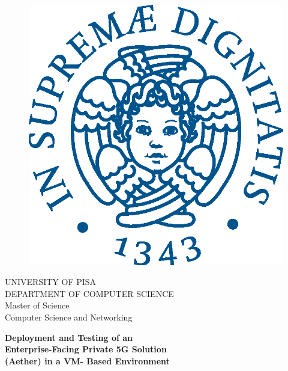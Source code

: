 \begin{titlepage}
\begin{figure}[!htb]
    \centering
    \includegraphics[keepaspectratio=true,scale=0.5]{images/logo/logo.eps}
\end{figure}

\begin{center}
    \LARGE{UNIVERSITY OF PISA}
    \vspace{5mm}
    \\ \large{DEPARTMENT OF COMPUTER SCIENCE}
    \vspace{5mm}
    \\ \LARGE{Master of Science \\ \vspace{2mm} Computer Science and Networking
}
\end{center}

\vspace{10mm}
\begin{center}
    {\LARGE{\bf Deployment and Testing of an \\ \vspace{3mm} Enterprise-Facing  Private 5G Solution \\ \vspace{3mm} (Aether) in a VM-
Based Environment}}
    
    

\end{center}
\end{titlepage}
